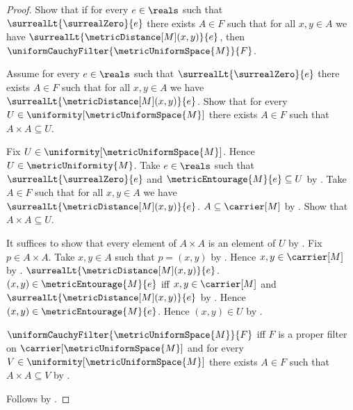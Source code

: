 \begin{proof}
    Show that if for every $e\in\reals$ such that
        $\surrealLt{\surrealZero}{e}$ there exists $A\in F$ such that
        for all $x,y\in A$ we have
            $\surrealLt{\metricDistance[M](x,y)}{e}$, then
        $\uniformCauchyFilter{\metricUniformSpace{M}}{F}$.
    \begin{subproof}
        Assume for every $e\in\reals$ such that
            $\surrealLt{\surrealZero}{e}$ there exists $A\in F$ such
            that for all $x,y\in A$ we have
                $\surrealLt{\metricDistance[M](x,y)}{e}$.
        Show that for every
            $U\in\uniformity[\metricUniformSpace{M}]$ there exists
            $A\in F$ such that $A\times A\subseteq U$.
        \begin{subproof}
            Fix $U\in\uniformity[\metricUniformSpace{M}]$.
            Hence $U\in\metricUniformity{M}$.
            Take $e\in\reals$ such that
                $\surrealLt{\surrealZero}{e}$ and
                $\metricEntourage{M}{e}\subseteq U$ by
                .
            Take $A\in F$ such that for all $x,y\in A$ we have
                $\surrealLt{\metricDistance[M](x,y)}{e}$.
            $A\subseteq\carrier[M]$ by .
            Show that $A\times A\subseteq U$.
            \begin{subproof}
                It suffices to show that every element of $A\times A$ is an
                    element of $U$ by .
                Fix $p\in A\times A$.
                Take $x,y\in A$ such that $p=(x,y)$ by
                    .
                Hence $x,y\in\carrier[M]$ by .
                $\surrealLt{\metricDistance[M](x,y)}{e}$.
                $(x,y)\in\metricEntourage{M}{e}$ iff
                    $x,y\in\carrier[M]$ and
                    $\surrealLt{\metricDistance[M](x,y)}{e}$ by
                    .
                Hence $(x,y)\in\metricEntourage{M}{e}$.
                Hence $(x,y)\in U$ by .
            \end{subproof}
        \end{subproof}
        $\uniformCauchyFilter{\metricUniformSpace{M}}{F}$ iff
            $F$ is a proper filter on
                $\carrier[\metricUniformSpace{M}]$ and
            for every $V\in\uniformity[\metricUniformSpace{M}]$
                there exists $A\in F$ such that $A\times A\subseteq V$ by
            .
    \end{subproof}
    Follows by \auto.
\end{proof}

